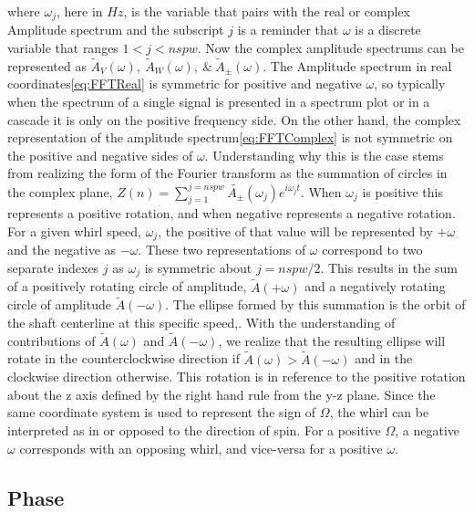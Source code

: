 where $ \omega_j $, here in $ Hz $, is the variable that pairs with the real or complex Amplitude spectrum and the subscript $ j $ is a reminder that $ \omega $ is a discrete variable that ranges $ 1<j<nspw $. Now the complex amplitude spectrums can be represented as $ \tilde{A}_V(\omega),\ \tilde{A}_W(\omega),\ \&\ \tilde{A}_\pm(\omega) $. The Amplitude spectrum in real coordinates\eqref{eq:FFTReal} is symmetric for positive and negative $ \omega $, so typically when the spectrum of a single signal is presented in a spectrum plot or in a cascade it is only on the positive frequency side. On the other hand, the complex representation of the amplitude spectrum\eqref{eq:FFTComplex} is not symmetric on the positive and negative sides of $ \omega $. Understanding why this is the case stems from realizing the form of the Fourier transform as the summation of circles in the complex plane, $ Z(n) = \sum_{j=1}^{j=nspw}\tilde{A_\pm}(\omega_j)e^{i\omega_j t} $. When $ \omega_j $ is positive this represents a positive rotation, and when negative represents a negative rotation. For a given whirl speed, $ \omega_j $, the positive of that value will be represented by $ +\omega $ and the negative as $ -\omega $. These two representations of $ \omega $ correspond to two separate indexes $ j $ as $ \omega_j $ is symmetric about $ j=nspw/2 $. This results in the sum of a positively rotating circle of amplitude, $ \tilde{A}(+\omega) $ and a negatively rotating circle of amplitude $ \tilde{A}(-\omega) $. The ellipse formed by this summation is the orbit of the shaft centerline at this specific speed\cite{goldman1999application},\cite{bently2003fundamentals}. With the understanding of contributions of $ \tilde{A}(\omega) $ and $ \tilde{A}(-\omega) $, we realize that the resulting ellipse will rotate in the counterclockwise direction if $ \tilde{A}(\omega)> \tilde{A}(-\omega) $ and in the clockwise direction otherwise. This rotation is in reference to the positive rotation about the z axis defined by the right hand rule from the y-z plane. Since the same coordinate system is used to represent the sign of $ \Omega $, the whirl can be interpreted as in or opposed to the direction of spin. For a positive $ \Omega $, a negative $ \omega $ corresponds with an opposing whirl, and vice-versa for a positive $ \omega $.
\subsection{Phase}
